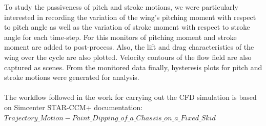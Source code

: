 To study the passiveness of pitch and stroke motions, we were particularly interested in recording the variation of the wing's pitching moment with respect to pitch angle as well as the variation of stroke moment with respect to stroke angle for each time-step. For this monitors of pitching moment and stroke moment are added to post-process. Also, the lift and drag characteristics of the wing over the cycle are also plotted. Velocity contours of the flow field are also captured as scenes. From the monitored data finally, hysteresis plots for pitch and stroke motions were generated for analysis.
\\
\\
The workflow followed in the work for carrying out the CFD simulation is based on Simcenter STAR-CCM+ documentation:\\ 
$Trajectory\_Motion - Paint\_Dipping\_of\_a\_Chassis\_on\_a\_Fixed\_Skid$



















